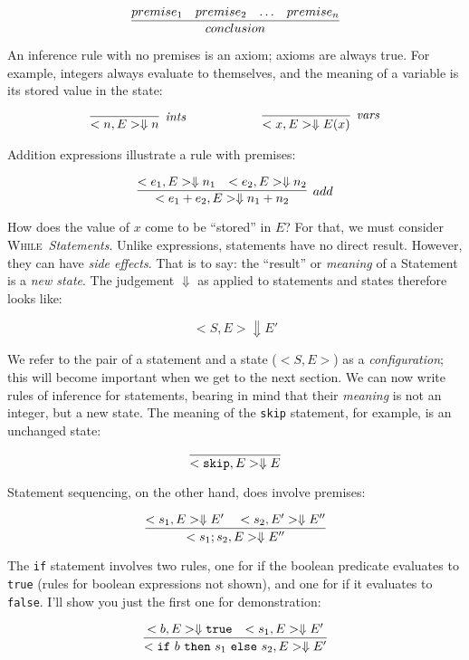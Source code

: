 \documentclass[11pt]{article}
\def\While{\textsc{While}}
\begin{document}
\[
\infer{conclusion}{premise_1 & premise_2 & \ldots & premise_n}
\]

\noindent 
An inference rule with no premises is an axiom; axioms are
always true. For example, integers always evaluate
to themselves, and the meaning of a variable is its stored value in the state:

\[
\begin{array}{llr}
\infer[$\textit{ints}$]{< n, E > \Downarrow n}{}
&~~~~~~~~~~~~&
\infer[$\textit{vars}$]{<x, E> \Downarrow E(x)} {}
\end{array}
\]

\noindent Addition expressions illustrate a rule with premises: 

\[
\infer[add]{< e_1 + e_2, E > \Downarrow n_1 + n_2}{<e_1, E> \Downarrow
  n_1& <e_2, E> \Downarrow n_2}
\]

How does the value of $x$ come to be ``stored'' in $E$?  For that, we must 
consider \While~\emph{Statements}.  Unlike
expressions, statements have no direct result.  However, they can have
\emph{side effects}.  That is to say: the ``result'' or \emph{meaning} of a Statement is a
\emph{new state}.  The judgement $\Downarrow$ as applied to statements
and states therefore looks like: 

\[
< S, E> \Downarrow E' 
\]

We refer to the pair of a statement and a state ($<S, E>$) as
a \emph{configuration}; this will become important when we get to the next section.
%
We can now write rules of inference for statements, bearing in mind that
their \emph{meaning} is not an integer, but a new state.  The meaning of the
\texttt{skip} statement, for example, is an unchanged state:

\[
\infer{<\mathtt{skip}, E > \Downarrow E}{}
\]

\noindent Statement sequencing, on the other hand, does involve premises:

\[
\infer{<s_1 ; s_2, E> \Downarrow E''}{<s_1,E> \Downarrow E'
  ~~~ <s_2, E'> \Downarrow E''}
\]

\noindent The \texttt{if} statement involves two rules, one for if the
boolean predicate evaluates to \texttt{true} (rules for boolean expressions not
shown), and one for if it evaluates to \texttt{false}.  I'll show you just the
first one for demonstration:

\[
\infer{<\mathtt{if}~b~\mathtt{then}~s_1~\mathtt{else}~s_2, E> \Downarrow
  E'}{<b, E> \Downarrow \mathtt{true} & <s_1, E> \Downarrow
  E'}
\]
\end{document}

